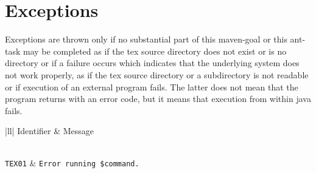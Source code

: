 \section{Exceptions}\label{sec:exception}

Exceptions are thrown only if no substantial part of 
this maven-goal or this ant-task may be completed 
as if the tex source directory does not exist or is no directory 
or if a failure occurs which indicates 
that the underlying system does not work properly, 
as if the tex source directory or a subdirectory is not readable 
or if execution of an external program fails. 
The latter does not mean that the program returns with an error code, 
but it means that execution from within java fails.

\begin{longtable}{|ll|}
\toprule
Identifier        & Message  \\
  \\
\midrule
\midrule
\endfirsthead%
\bottomrule
\caption{\label{tab:TEX} The \texttt{BuildFailureException}s of the class
\texttt{CommandExecutorImpl} }
\endlastfoot%
\texttt{\footnotesize TEX01} & \texttt{\footnotesize Error running \$command. }  \\
 \\
\end{longtable}



